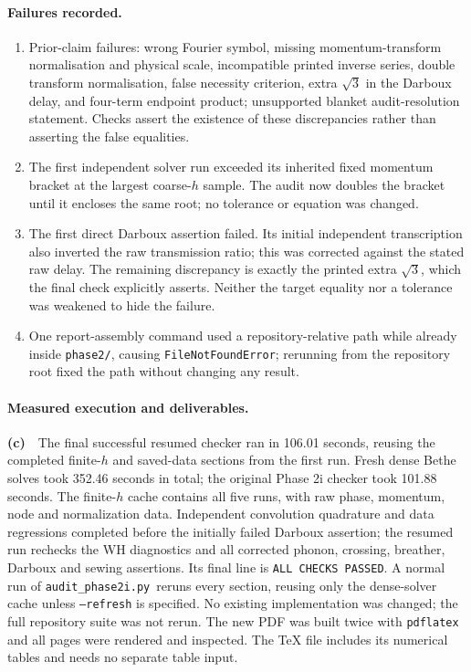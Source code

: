 \documentclass[11pt,a4paper]{article}
\newcommand{\Lc}{\textbf{(c)}\ }
\newcommand{\scr}{\texttt{audit\_\allowbreak phase2i.py}}
\begin{document}
\paragraph{Failures recorded.}
\begin{enumerate}
\item Prior-claim failures: wrong Fourier symbol, missing momentum-transform
normalisation and physical scale, incompatible printed inverse series, double
transform normalisation, false necessity criterion, extra $\sqrt3$ in the Darboux delay, and four-term endpoint
product; unsupported blanket audit-resolution statement. Checks assert the
existence of these discrepancies rather than asserting the false equalities.
\item The first independent solver run exceeded its inherited fixed momentum
bracket at the largest coarse-$h$ sample. The audit now doubles the bracket
until it encloses the same root; no tolerance or equation was changed.
\item The first direct Darboux assertion failed. Its initial independent
transcription also inverted the raw transmission ratio; this was corrected
against the stated raw delay. The remaining discrepancy is exactly the
printed extra $\sqrt3$, which the final check explicitly asserts. Neither
the target equality nor a tolerance was weakened to hide the failure.
\item One report-assembly command used a repository-relative path while
already inside \texttt{phase2/}, causing \texttt{FileNotFoundError}; rerunning
from the repository root fixed the path without changing any result.
\end{enumerate}

\paragraph{Measured execution and deliverables.}
\Lc\ The final successful resumed checker ran in 106.01 seconds, reusing the
completed finite-$h$ and saved-data sections from the first run. Fresh dense
Bethe solves took 352.46 seconds in total; the original Phase 2i checker took
101.88 seconds. The finite-$h$ cache contains all five runs, with raw phase,
momentum, node and normalization data. Independent convolution quadrature
and data regressions completed before the initially failed Darboux assertion;
the resumed run rechecks the WH diagnostics and all corrected phonon, crossing,
breather, Darboux and sewing assertions. Its final line is
\texttt{ALL CHECKS PASSED}. A normal run of \scr\ reruns every section,
reusing only the dense-solver cache unless \texttt{--refresh} is specified.
No existing implementation was changed; the full repository suite was not
rerun. The new PDF was built twice with \texttt{pdflatex} and all pages
were rendered and inspected. The TeX file includes its numerical tables
and needs no separate table input.
\end{document}
